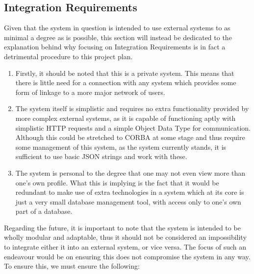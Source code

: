 \documentclass[10pt,a4paper]{exam}
\begin{document}
\subsection{Integration Requirements}
Given that the system in question is intended to use external systems to as minimal a degree as is possible, this section will instead be dedicated to the explanation behind why focusing on Integration Requirements is in fact a detrimental procedure to this project plan.

\begin{enumerate}
	\item Firstly, it should be noted that this is a private system. This means that there is little need for a connection with any system which provides some form of linkage to a more major network of users.
	\item The system itself is simplistic and requires no extra functionality provided by more complex external systems, as it is capable of functioning aptly with simplistic HTTP requests and a simple Object Data Type for communication. Although this could be stretched to CORBA at some stage and thus require some management of this system, as the system currently stands, it is sufficient to use basic JSON strings and work with these.
	\item The system is personal to the degree that one may not even view more than one's own profile. What this is implying is the fact that it would be redundant to make use of extra technologies in a system which at its core is just a very small database management tool, with access only to one's own part of a database.
\end{enumerate}
Regarding the future, it is important to note that the system is intended to be wholly modular and adaptable, thus it should not be considered an impossibility to integrate either it into an external system, or vice versa. The focus of such an endeavour would be on ensuring this does not compromise the system in any way. To ensure this, we must ensure the following:
\end{document}
